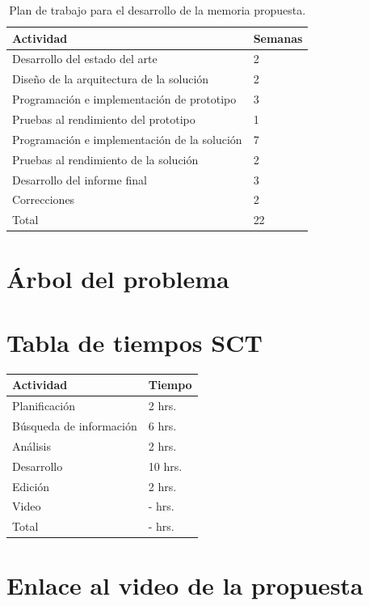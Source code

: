 \documentclass[conference,compsoc]{IEEEtran}
\begin{document}
\begin{table}[h]
    \centering
    \caption{Plan de trabajo para el desarrollo de la memoria propuesta.}
    \label{tab:plan-trabajo}
    \begin{tabular}{|l|l|}
        \hline
        Actividad                                    & Semanas \\ \hline
        Desarrollo del estado del arte               & 2       \\ \hline
        Diseño de la arquitectura de la solución     & 2       \\ \hline
        Programación e implementación de prototipo   & 3       \\ \hline
        Pruebas al rendimiento del prototipo         & 1       \\ \hline
        Programación e implementación de la solución & 7       \\ \hline
        Pruebas al rendimiento de la solución        & 2       \\ \hline
        Desarrollo del informe final                 & 3       \\ \hline
        Correcciones                                 & 2       \\ \hline
        Total                                        & 22      \\ \hline
    \end{tabular}
\end{table}





\newpage

\appendices

\section{Árbol del problema}

\section{Tabla de tiempos SCT}

\begin{table}[h]
    \begin{tabular}{|l|l|}
        \hline
        Actividad                   & Tiempo    \\ \hline
        Planificación               & 2  hrs.    \\ \hline
        Búsqueda de información     & 6  hrs.    \\ \hline
        Análisis                    & 2  hrs.    \\ \hline
        Desarrollo                  & 10 hrs.    \\ \hline
        Edición                     & 2  hrs.    \\ \hline
        Video                       & -  hrs.    \\ \hline
        Total                       & -  hrs.    \\ \hline
    \end{tabular}
\end{table}

\section{Enlace al video de la propuesta}
\end{document}
